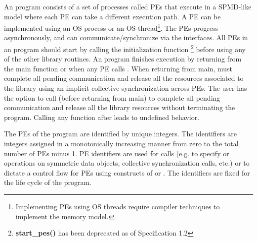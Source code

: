 An \openshmem{} program consists of a set of \openshmem{} processes called \ac{PE}s that execute in a \ac{SPMD}-like model where each \ac{PE} can take a different execution path. A \ac{PE} can be implemented using an OS process or an OS thread\footnote{Implementing \ac{PE}s using OS threads require compiler techniques to implement the \openshmem{} memory model.}.
The \ac{PE}s progress asynchronously, and can communicate/synchronize 
via the \openshmem{} interfaces. All \ac{PE}s in an \openshmem{} program should start by calling the initialization function   \footnote{\textbf{start\_pes()} has been deprecated as of Specification 1.2} before using any of the other \openshmem{} library routines. 
An \openshmem program finishes execution by returning from the main function or when any PE calls . When returning from main, \openshmem must complete all pending communication and release all the resources associated to the library using an implicit collective synchronization across PEs. The
user has the option to call  (before returning from main) to complete all pending communication and release all the \openshmem library resources without terminating the program. Calling any \openshmem function after  leads to undefined behavior.

The \ac{PE}{}s of the \openshmem{} program are identified by unique integers. The identifiers are integers assigned in a monotonically increasing manner from zero to the total number of \ac{PE}s minus 1. \ac{PE} identifiers are used for \openshmem{} calls (e.g. to specify \PUT{} or \GET{} operations on symmetric data objects, collective synchronization calls, etc.) or to dictate a control flow for \ac{PE}s using constructs of \Clang{} or \Fortran. The identifiers are fixed for the life cycle of the \openshmem{} program.


